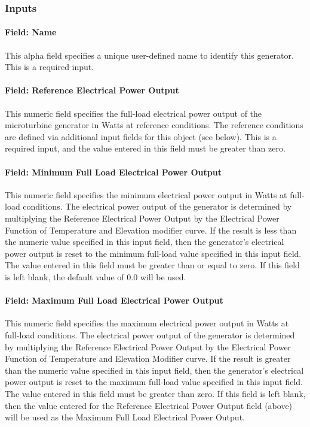 \subsubsection{Inputs}\label{inputs-9-004}

\paragraph{Field: Name}\label{field-name-10-003}

This alpha field specifies a unique user-defined name to identify this generator. This is a required input.

\paragraph{Field: Reference Electrical Power Output}\label{field-reference-electrical-power-output}

This numeric field specifies the full-load electrical power output of the microturbine generator in Watts at reference conditions. The reference conditions are defined via additional input fields for this object (see below). This is a required input, and the value entered in this field must be greater than zero.

\paragraph{Field: Minimum Full Load Electrical Power Output}\label{field-minimum-full-load-electrical-power-output}

This numeric field specifies the minimum electrical power output in Watts at full-load conditions. The electrical power output of the generator is determined by multiplying the Reference Electrical Power Output by the Electrical Power Function of Temperature and Elevation modifier curve. If the result is less than the numeric value specified in this input field, then the generator's electrical power output is reset to the minimum full-load value specified in this input field. The value entered in this field must be greater than or equal to zero. If this field is left blank, the default value of 0.0 will be used.

\paragraph{Field: Maximum Full Load Electrical Power Output}\label{field-maximum-full-load-electrical-power-output}

This numeric field specifies the maximum electrical power output in Watts at full-load conditions. The electrical power output of the generator is determined by multiplying the Reference Electrical Power Output by the Electrical Power Function of Temperature and Elevation Modifier curve. If the result is greater than the numeric value specified in this input field, then the generator's electrical power output is reset to the maximum full-load value specified in this input field. The value entered in this field must be greater than zero. If this field is left blank, then the value entered for the Reference Electrical Power Output field (above) will be used as the Maximum Full Load Electrical Power Output.

